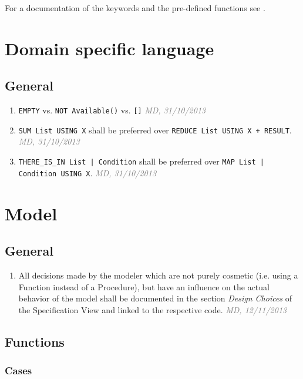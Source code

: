 \documentclass[draft, a4paper, oneside]{scrreprt}
\let\emph\textsl
\newcommand{\literally}[1]{\textsf{\emph{#1}}}
\newcommand{\code}[1]{\lstinline$#1$}
\newcommand{\ruleauthor}[2]{\mbox{}\newline\mbox{}\hfill{\footnotesize\textcolor{gray}{\emph{#1, #2}}}\xspace}}
\newcommand{\ruleauthor}[2]{}
\begin{document}
For a documentation of the keywords and the pre-defined functions see \cite{efstechdesign}.



\chapter{Domain specific language}

\section{General}
\begin{enumerate}
\item {} \code{EMPTY} vs. \code{NOT Available()} vs. \code{[]} \ruleauthor{MD}{31/10/2013}
\item \code{SUM List USING X} shall be preferred over \code{REDUCE List USING X + RESULT}. \ruleauthor{MD}{31/10/2013}
\item \code{THERE_IS_IN List | Condition} shall be preferred over \code{MAP List | Condition USING X}. \ruleauthor{MD}{31/10/2013}
\end{enumerate}


\chapter{Model}

\section{General}

\begin{enumerate}
\item \label{rule:model_general_design_choices} All decisions made by the modeler which are not purely cosmetic (i.e. using a Function instead of a Procedure), but have an influence on the actual behavior of the model shall be documented in the section \literally{Design Choices} of the Specification View and linked to the respective code. \ruleauthor{MD}{12/11/2013}

\end{enumerate}


\section{Functions}
\subsection{Cases}
\end{document}
